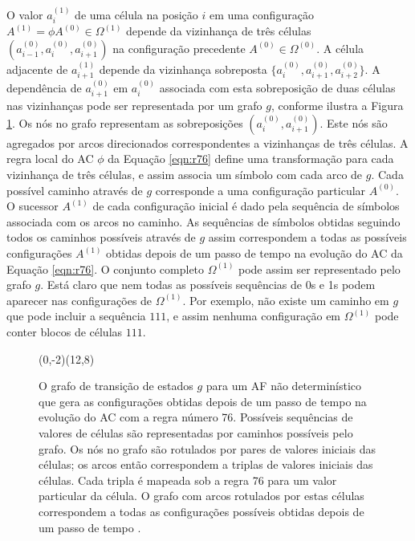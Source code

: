 \documentclass[12pt,a4paper]{article}
\let\vState=\origState
\begin{document}
O valor $a_i^{(1)}$ de uma célula na posição $i$ em uma configuração
$A^{(1)} = \phi A^{(0)} \in \Omega^{(1)}$ depende da vizinhança de três
células $(a_{i-1}^{(0)},a_i^{(0)},a_{i+1}^{(0)})$ na configuração precedente
$A^{(0)} \in \Omega^{(0)}$. A célula adjacente de $a_{i+1}^{(1)}$ depende da
vizinhança sobreposta $\{a_i^{(0)},a_{i+1}^{(0)},a_{i+2}^{(0)}\}$. A
dependência de $a_{i+1}^{(0)}$ em $a_i^{(0)}$ associada com esta sobreposição
de duas células nas vizinhanças pode ser representada por um grafo $g$, conforme
ilustra a Figura \ref{fig:A1}. Os nós no grafo representam as sobreposições
$(a_i^{(0)},a_{i+1}^{(0)})$. Este nós são agregados por arcos direcionados
correspondentes a vizinhanças de três células. A regra local do AC
$\phi$ da Equação \ref{eqn:r76} define uma transformação para cada
vizinhança de três células, e assim associa um símbolo com cada arco de $g$.
Cada possível caminho através de $g$ corresponde a uma configuração particular
$A^{(0)}$. O sucessor $A^{(1)}$ de cada configuração inicial é dado pela
sequência de símbolos associada com os arcos no caminho. As sequências de
símbolos obtidas seguindo todos os caminhos possíveis através de $g$ assim
correspondem a todas as possíveis configurações $A^{(1)}$ obtidas depois
de um passo de tempo na evolução do AC da Equação \ref{eqn:r76}. O
conjunto completo $\Omega^{(1)}$ pode assim ser representado pelo grafo
$g$. Está claro que nem todas as possíveis sequências de 0s e 1s podem
aparecer nas configurações de $\Omega^{(1)}$. Por exemplo, não existe um
caminho em $g$ que pode incluir a sequência $111$, e assim nenhuma
configuração em $\Omega^{(1)}$ pode conter blocos de células $111$.

\begin{figure}[htp]
\begin{center}
\begin{VCPicture}{(0,-2)(12,8)}
\vState[00]{(0,3)}{A} \vState[01]{(6,6)}{B}
\vState[10]{(6,0)}{C} \vState[11]{(12,3)}{D}
 
 
 
 
\end{VCPicture}
\caption{O grafo de transição de estados $g$ para um AF
não determinístico que gera as configurações obtidas depois de um passo
de tempo na evolução do AC com a regra número 76.
Possíveis sequências de valores de células são representadas por
caminhos possíveis pelo grafo. Os nós no grafo são rotulados por pares
de valores iniciais das células; os arcos então correspondem a triplas
de valores iniciais das células. Cada tripla é mapeada sob a regra 76
para um valor particular da célula. O grafo com arcos rotulados por estas
células correspondem a todas as configurações possíveis obtidas depois
de um passo de tempo .}
\label{fig:A1}
\end{center}
\end{figure}
\end{document}
